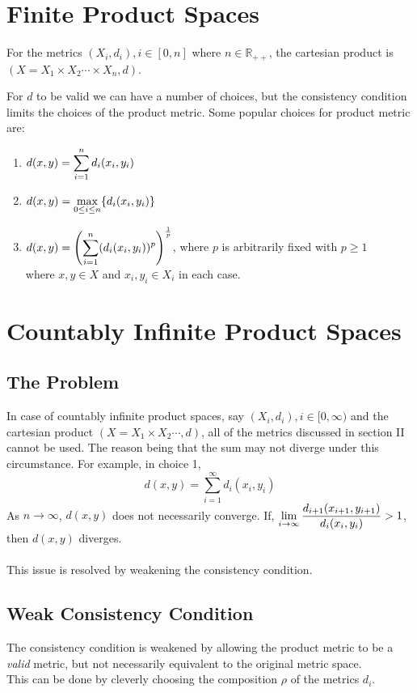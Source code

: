 \documentclass[12pt]{article}
\begin{document}
\section{Finite Product Spaces}
For the metrics $(X_i, d_i), i \in [0, n]$ where $n \in \mathbb{R_{++}}$, the cartesian product is $(X = X_1 \times X_2 \dotsb \times X_n, d)$.

For $d$ to be valid we can have a number of choices, but the consistency condition limits the choices of the product metric. Some popular choices for product metric are:
\begin{enumerate}
    \item $d(x, y) = \mathlarger{\sum_{i=1}^{n} d_i(x_i, y_i)}$
    \item $d(x, y) = \mathlarger{\max_{0 \le i \le n} \{d_i(x_i, y_i)\}}$
    \item $d(x, y) = \mathlarger{{\left(\sum_{i=1}^{n} (d_i(x_i, y_i))^p\right)}^{\frac{1}{p}}}$, where $p$ is arbitrarily fixed with $p \ge 1$ \\
    where $x,y \in X$ and $x_i, y_i \in X_i$ in each case.
\end{enumerate}

\section{Countably Infinite Product Spaces}
\subsection{The Problem}
In case of countably infinite product spaces, say $(X_i, d_i), i \in [0, \infty)$ and the cartesian product $(X = X_1 \times X_2 \dotsb, d)$, all of the metrics discussed in section II cannot be used. The reason being that the sum may not diverge under this circumstance. For example, in choice 1,
$$
d(x, y) = {\sum_{i=1}^{\infty} d_i(x_i, y_i)}
$$
As $n \to \infty$, $d(x, y)$ does not necessarily converge.
If, $\mathlarger{\lim_{i \to \infty}{\frac{d_{i+1}(x_{i+1}, y_{i+1})}{d_i(x_i, y_i)}}} > 1$, then $d(x, y)$ diverges. 
\\
\\
This issue is resolved by weakening the consistency condition. 

\subsection{Weak Consistency Condition}
The consistency condition is weakened by allowing the product metric to be a \emph{valid} metric, but not necessarily equivalent to the original metric space.
\\
This can be done by cleverly choosing the composition $\rho$ of the metrics $d_i$.
\end{document}
